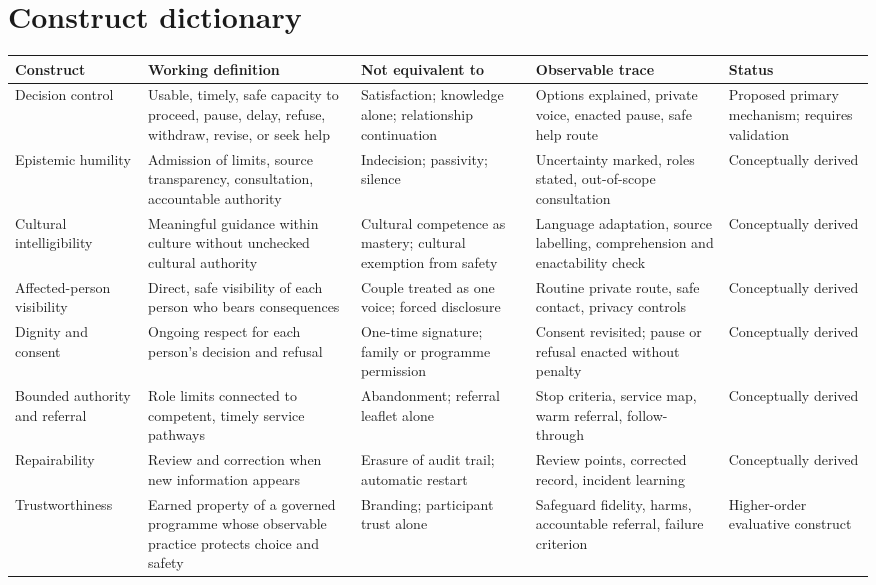 \documentclass[10pt,twocolumn]{article}
\begin{document}
\section{Construct dictionary}
\footnotesize
\begin{tabularx}{\textwidth}{@{}p{2.6cm}YYYp{2.6cm}@{}}
\toprule
\textbf{Construct} & \textbf{Working definition} & \textbf{Not equivalent to} & \textbf{Observable trace} & \textbf{Status}\\
\midrule
Decision control & Usable, timely, safe capacity to proceed, pause, delay, refuse, withdraw, revise, or seek help & Satisfaction; knowledge alone; relationship continuation & Options explained, private voice, enacted pause, safe help route & Proposed primary mechanism; requires validation\\
Epistemic humility & Admission of limits, source transparency, consultation, accountable authority & Indecision; passivity; silence & Uncertainty marked, roles stated, out-of-scope consultation & Conceptually derived\\
Cultural intelligibility & Meaningful guidance within culture without unchecked cultural authority & Cultural competence as mastery; cultural exemption from safety & Language adaptation, source labelling, comprehension and enactability check & Conceptually derived\\
Affected-person visibility & Direct, safe visibility of each person who bears consequences & Couple treated as one voice; forced disclosure & Routine private route, safe contact, privacy controls & Conceptually derived\\
Dignity and consent & Ongoing respect for each person's decision and refusal & One-time signature; family or programme permission & Consent revisited; pause or refusal enacted without penalty & Conceptually derived\\
Bounded authority and referral & Role limits connected to competent, timely service pathways & Abandonment; referral leaflet alone & Stop criteria, service map, warm referral, follow-through & Conceptually derived\\
Repairability & Review and correction when new information appears & Erasure of audit trail; automatic restart & Review points, corrected record, incident learning & Conceptually derived\\
Trustworthiness & Earned property of a governed programme whose observable practice protects choice and safety & Branding; participant trust alone & Safeguard fidelity, harms, accountable referral, failure criterion & Higher-order evaluative construct\\
\bottomrule
\end{tabularx}
\end{document}
